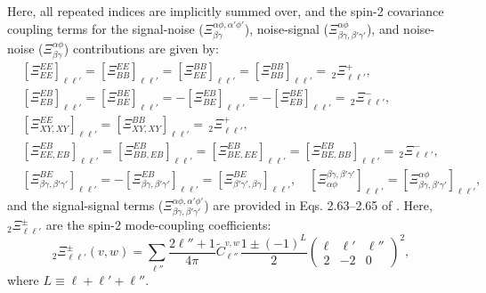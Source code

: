 \documentclass[aps,twocolumn, superscriptaddress, english, nofootinbib, 10pt]{revtex4-2}
\newcommand{\wtj}[6]{\left(\begin{array}{ccc} #1 & #2 & #3\\#4 & #5 & #6\end{array} \right)}
\begin{document}
  Here, all repeated indices are implicitly summed over, and the spin-2 covariance coupling terms for the signal-noise ($\Xi^{\alpha\phi,\alpha'\phi'}_{\beta\gamma}$), noise-signal ($\Xi^{\alpha\phi}_{\beta\gamma,\beta'\gamma'}$), and noise-noise ($\Xi^{\alpha\phi}_{\beta\gamma}$) contributions are given by:
  \begin{align}
    &\left[\Xi^{EE}_{EE}\right]_{\ell\ell'}=
    \left[\Xi^{EE}_{BB}\right]_{\ell\ell'}=
    \left[\Xi^{BB}_{EE}\right]_{\ell\ell'}=
    \left[\Xi^{BB}_{BB}\right]_{\ell\ell'}=\,_2\Xi_{\ell\ell'}^+,\\
    &\left[\Xi^{EB}_{EB}\right]_{\ell\ell'}=
    \left[\Xi^{BE}_{BE}\right]_{\ell\ell'}=
    -\left[\Xi^{EB}_{BE}\right]_{\ell\ell'}=
    -\left[\Xi^{BE}_{EB}\right]_{\ell\ell'}=\,_2\Xi_{\ell\ell'}^-,\\
    &\left[\Xi^{EE}_{XY,XY}\right]_{\ell\ell'}=\left[\Xi^{BB}_{XY,XY}\right]_{\ell\ell'}=\,_2\Xi^+_{\ell\ell'},\\
    &\left[\Xi^{EB}_{EE,EB}\right]_{\ell\ell'}=\left[\Xi^{EB}_{BB,EB}\right]_{\ell\ell'}=\left[\Xi^{EB}_{BE,EE}\right]_{\ell\ell'}=\left[\Xi^{EB}_{BE,BB}\right]_{\ell\ell'}=\,_2\Xi^-_{\ell\ell'},\\
    &\left[\Xi^{BE}_{\beta\gamma,\beta'\gamma'}\right]_{\ell\ell'}=-\left[\Xi^{EB}_{\beta\gamma,\beta'\gamma'}\right]_{\ell\ell'}=\left[\Xi^{BE}_{\beta'\gamma',\beta\gamma}\right]_{\ell\ell'},\hspace{12pt}\left[\Xi^{\beta\gamma,\beta'\gamma'}_{\alpha\phi}\right]_{\ell\ell'}=\left[\Xi^{\alpha\phi}_{\beta\gamma,\beta'\gamma'}\right]_{\ell\ell'},
  \end{align}
  and the signal-signal terms ($\Xi^{\alpha\phi,\alpha'\phi'}_{\beta\gamma,\beta'\gamma'}$) are provided in Eqs. 2.63--2.65 of \cite{1906.11765}. Here, $_2\Xi^\pm_{\ell\ell'}$ are the spin-2 mode-coupling coefficients:
  \begin{equation}
    _2\Xi^{\pm}_{\ell\ell'}(v,w)=\sum_{\ell''}\frac{2\ell''+1}{4\pi}\tilde{C}^{v,w}_{\ell''}\frac{1\pm(-1)^{L}}{2}\wtj{\ell}{\ell'}{\ell''}{2}{-2}{0}^2,
  \end{equation}
  where $L\equiv\ell+\ell'+\ell''$.
\end{document}
